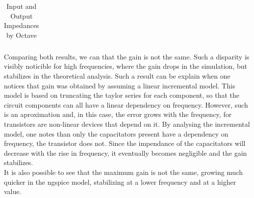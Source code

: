 %    

\FloatBarrier
\begin{table}[h]
  \centering
  \begin{tabular}{|c|c|}
    \hline    
    
    \hline
  \end{tabular}
  \caption{Input and Output Impedances by Octave}
  \label{tab:Spice1}
\end{table}
\FloatBarrier   


Comparing both results, we can that the gain is not the same. Such a disparity is visibly noticible for high frequencies, where the gain drops in the simulation, but stabilizes in the theoretical analysis. Such a result can be explain when one notices that gain was obtained by assuming a linear incremental model. This model is based on truncating the taylor series for each component, so that the circuit components can all have a linear dependency on frequency. However, such is an aproximation and, in this case, the error grows with the frequency, for transistors are non-linear devices that depend on it. By analysing the incremental model, one notes than only the capacitators present have a dependency on frequency, the transistor does not. Since the impendance of the capacitators will decrease with the rise in frequency, it eventually becomes negligible and the gain stabilizes.\\
It is also possible to see that the maximum gain is not the same, growing much quicker in the ngspice model, stabilizing at a lower frequency and at a higher value.\\





